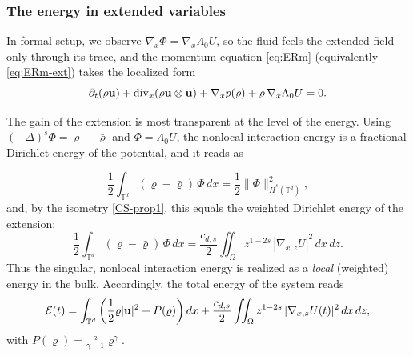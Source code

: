 \documentclass[12pt,a4paper,twoside]{article}
\newcommand{\Div}{\operatorname{div}}
\newcommand{\vr}{\varrho}
\newcommand{\vu}{\vc{u}}
\newcommand{\vc}[1]{{\bf #1}}
\newcommand{\Grad}{\nabla}
\numberwithin{equation}{section}%
\begin{document}
	
	\subsubsection*{The energy in extended variables}
	\label{sec:energy-extended}
		In formal setup, we observe $\Grad_x \Phi = \Grad_x \Lambda_0 U$, so the fluid feels the extended field only through its trace, and the momentum equation \eqref{eq:ERm} (equivalently \eqref{eq:ERm-ext}) takes the localized form
	\begin{equation}\label{eq:ERm-2}
		\partial_t(\vr \vu) + \Div_x (\vr \vu \otimes \vu ) + \Grad_x p(\vr) + \vr\, \Grad_x \Lambda_0 U = 0 .
	\end{equation}
	
	The gain of the extension is most transparent at the level of the energy. Using $(-\Delta)^s \Phi = \vr - \bar\vr$ and $\Phi = \Lambda_0 U$, the nonlocal interaction energy is a fractional Dirichlet energy of the potential, and it reads as
	
	\begin{equation*}
		\frac{1}{2} \int_{\mathbb{T}^d} (\vr - \bar\vr)\, \Phi \,dx
		= \frac{1}{2} \big\| \Phi \big\|_{\dot{H}^s(\mathbb{T}^d)}^2 ,
	\end{equation*}
	and, by the isometry \eqref{CS-prop1}, this equals the weighted Dirichlet energy of the extension:
	\begin{equation*}
		\frac{1}{2} \int_{\mathbb{T}^d} (\vr - \bar\vr)\, \Phi \,dx
		= \frac{c_{d,s}}{2} \iint_{\Omega} z^{1-2s}\, |\Grad_{x,z} U|^2 \,dx\,dz .
	\end{equation*}
	Thus the singular, nonlocal interaction energy is realized as a \emph{local} (weighted) energy in the bulk. Accordingly, the total energy of the system reads
	\begin{equation}\label{en_def_ext}
		\mathcal{E}(t)
		= \int_{\mathbb{T}^d} \left( \frac{1}{2} \vr |\vu|^2 + P(\vr) \right) dx
		+ \frac{c_{d,s}}{2} \iint_{\Omega} z^{1-2s}\, |\Grad_{x,z} U(t)|^2 \,dx\,dz ,
	\end{equation}
	with $P(\vr) = \tfrac{a}{\gamma-1}\vr^\gamma$. 
	
\end{document}
